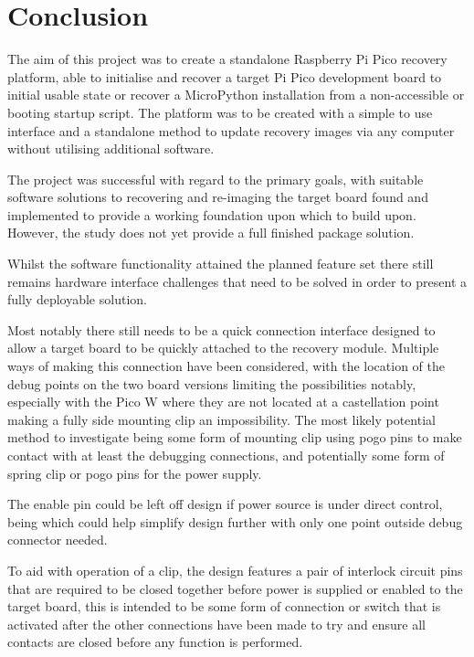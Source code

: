 \clearpage%
\vspace{21.5pt}
\chapter{Conclusion}

The aim of this project was to create a standalone Raspberry Pi Pico recovery platform, able to initialise and recover a target Pi Pico development board to initial usable state or recover a MicroPython installation from a non-accessible or booting startup script. The platform was to be created with a simple to use interface and a standalone method to update recovery images via any computer without utilising additional software.

The project was successful with regard to the primary goals, with suitable software solutions to recovering and re-imaging the target board found and implemented to provide a working foundation upon which to build upon. However, the study does not yet provide a full finished package solution.

Whilst the software functionality attained the planned feature set there still remains hardware interface challenges that need to be solved in order to present a fully deployable solution.

Most notably there still needs to be a quick connection interface designed to allow a target board to be quickly attached to the recovery module. Multiple ways of making this connection have been considered, with the location of the debug points on the two board versions limiting the possibilities notably, especially with the Pico W where they are not located at a castellation point making a fully side mounting clip an impossibility. The most likely potential method to investigate being some form of mounting clip using pogo pins to make contact with at least the debugging connections, and potentially some form of spring clip or pogo pins for the power supply.

The enable pin could be left off design if power source is under direct control, being which could help simplify design further with only one point outside debug connector needed.

To aid with operation of a clip, the design features a pair of interlock circuit pins that are required to be closed together before power is supplied or enabled to the target board, this is intended to be some form of connection or switch that is activated after the other connections have been made to try and ensure all contacts are closed before any function is performed.

